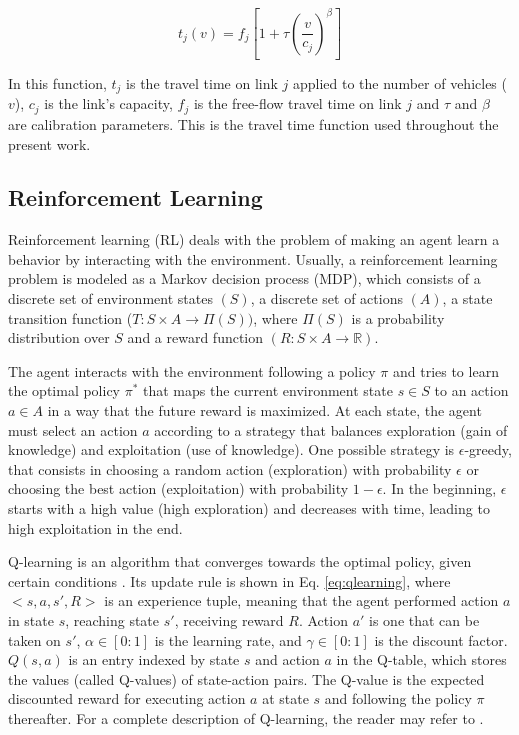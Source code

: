 \documentclass{RITA}
\newcommand{\travTime}{\ensuremath{t_j}} 	%
\newcommand{\fftt}{\ensuremath{f_j}} 		%
\newcommand{\linkCap}{\ensuremath{c_j}}		%
\newcommand{\veh}{\ensuremath{v}}		%
\begin{document}
\begin{equation}
\label{eq:tt}
\travTime(\veh) = \fftt[1 + \tau \left(\frac{\veh}{\linkCap}\right)^\beta]
\end{equation}

In this function, $\travTime$ is the travel time on link $j$ applied to the number of vehicles ($\veh$), $\linkCap$ is the link's capacity, $\fftt$ is the free-flow travel time on link $j$ and $\tau$ and $\beta$ are calibration parameters. This is the travel time function used throughout the present work.

\subsection{Reinforcement Learning}
\label{sec:rl}
Reinforcement learning (RL) deals with the problem of making an agent learn a behavior by interacting with the environment. Usually, a reinforcement learning problem is modeled as a Markov decision process (MDP), which consists of a discrete set of environment states $(S)$, a discrete set of actions $(A)$, a state transition function ($T: S \times A \to \Pi(S))$, where $\Pi(S)$ is a probability distribution over $S$ and a reward function $(R: S \times A \to \mathbb{R})$. %

The agent interacts with the environment following a policy $\pi$ and tries to learn the optimal policy $\pi^*$ that maps the current environment state $s \in S$ to an action $a \in A$ in a way that the future reward is maximized. At each state, the agent must select an action $a$ according to a strategy that balances exploration (gain of knowledge) and exploitation (use of knowledge). One possible strategy is $\epsilon$-greedy, that consists in choosing a random action (exploration) with probability $\epsilon$ or choosing the best action (exploitation) with probability $1 - \epsilon$. In the beginning, $\epsilon$ starts with a high value (high exploration) and decreases with time, leading to high exploitation in the end.

Q-learning is an algorithm that converges towards the optimal policy, given certain conditions \cite{Watkins&Dayan1992}. Its update rule is shown in Eq. \eqref{eq:qlearning}, where $<s,a,s',R>$ is an experience tuple, meaning that the agent performed action $a$ in state $s$, reaching state $s'$, receiving reward $R$. Action $a'$ is one that can be taken on $s'$, $\alpha \in [0:1]$ is the learning rate, and $\gamma \in [0:1]$ is the discount factor. $Q(s,a)$ is an entry indexed by state $s$ and action $a$ in the Q-table, which stores the values (called Q-values) of state-action pairs. The Q-value is the expected discounted reward for executing action $a$ at state $s$ and following the policy $\pi$ thereafter. For a complete description of Q-learning, the reader may refer to \cite{Watkins&Dayan1992}.
\end{document}
